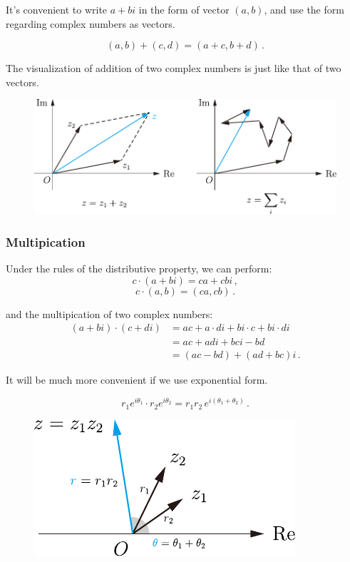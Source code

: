 \documentclass[UTF8]{ctexart}
\begin{document}
It's convenient to write $ a + b i $ in the form of vector $ (a, b) $, and use the form regarding complex numbers as vectors. 

\[ (a, b) + (c, d) = (a + c, b + d) \,.\]

The visualization of addition of two complex numbers is just like that of two vectors.

\begin{figure}[H]
    \centering
    \includegraphics[width = 0.8\linewidth]{./pic/addition.pdf}
\end{figure}



\subsubsection{Multipication}
Under the rules of the distributive property, we can perform:
\[ c \cdot (a + b i) = ca + cb i \,,\]
\[ c \cdot (a, b) = (ca, cb) \,.\]

and the multipication of two complex numbers:
\begin{align*}
    (a + b i) \cdot (c + d i) &= a c + a \cdot d i + b i \cdot c + b i \cdot d i \\
    &= ac + ad i + bc i - bd \\
    &= (ac - bd) + (ad + bc) i \,.
\end{align*}

It will be much more convenient if we use exponential form.

\[ r_1 e^{i \theta_1} \cdot r_2 e^{i \theta_2} = r_1 r_2\, e^{i (\theta_1 + \theta_2)} \,.\]

\begin{figure}[H]
    \centering
    \includegraphics[width = 0.5\linewidth]{./pic/multi.pdf}
\end{figure}
\end{document}
